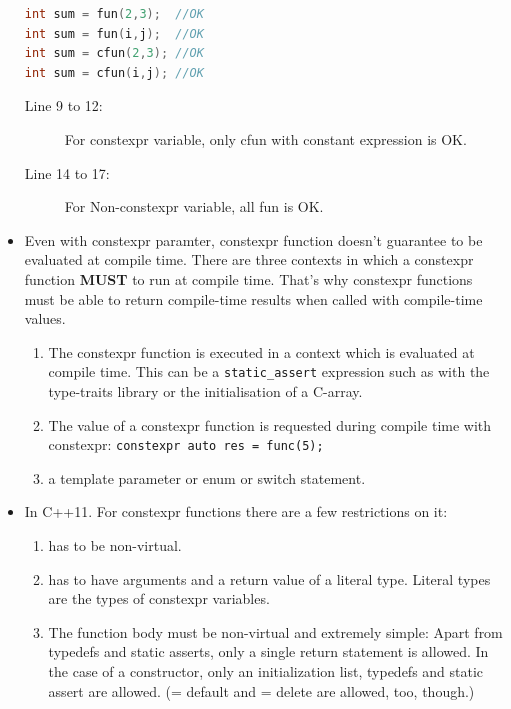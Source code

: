 \documentclass[a4paper,11pt,twoside]{book}
\begin{document}
\begin{itemize}
\begin{lstlisting}[frame=single, language=c++]
int sum = fun(2,3);  //OK
int sum = fun(i,j);  //OK
int sum = cfun(2,3); //OK
int sum = cfun(i,j); //OK
\end{lstlisting}
	
	\begin{description}
		\item[Line 9 to 12:] For constexpr variable, only cfun with constant expression is OK.
		\item[Line 14 to 17:] For Non-constexpr variable, all fun is OK.
	\end{description}
	
	\item Even with constexpr paramter, constexpr function doesn't guarantee to be evaluated at compile time. There are three contexts in which a constexpr function \textbf{MUST} to run at compile time. That's why constexpr functions must be able to return compile-time results when called with compile-time values.

	\begin{enumerate}
		\item The constexpr function is executed in a context which is evaluated at compile time. This can be a \texttt{static\_assert} expression such as with the type-traits library or the initialisation of a C-array.
		
		\item The value of a constexpr function is requested during compile time with constexpr: \texttt{constexpr auto res = func(5);}
		
		\item a template parameter or enum or switch statement.
	\end{enumerate}
	
	\item In C++11. For constexpr functions there are a few restrictions on it:
	\begin{enumerate}
		\item has to be non-virtual.
		
		\item has to have arguments and a return value of a literal type. Literal types are the types of constexpr variables.
		
		\item The function body must be non-virtual and extremely simple: Apart from typedefs and static asserts, only a single return statement is allowed. In the case of a constructor, only an initialization list, typedefs and static assert are allowed. (= default and = delete are allowed, too, though.)
	\end{enumerate}
	

\end{itemize}
\end{document}
